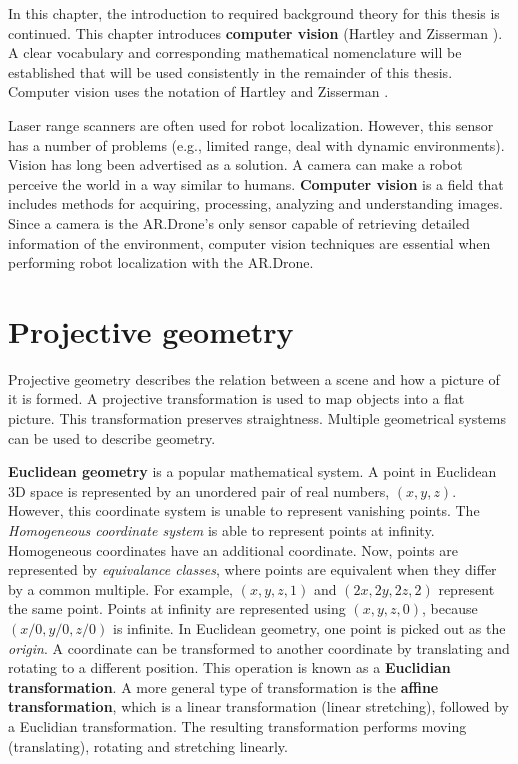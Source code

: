 In this chapter, the introduction to required background theory for this thesis is continued.
This chapter introduces \textbf{computer vision} (Hartley and Zisserman \cite{Hartley2004}).
A clear vocabulary and corresponding mathematical nomenclature will be established that will be used consistently in the remainder of this thesis.
Computer vision uses the notation of Hartley and Zisserman \cite{Hartley2004}.

Laser range scanners are often used for robot localization.
However, this sensor has a number of problems (e.g., limited range, deal with dynamic environments).
Vision has long been advertised as a solution.
A camera can make a robot perceive the world in a way similar to humans.
\textbf{Computer vision} is a field that includes methods for acquiring, processing, analyzing and understanding images.
Since a camera is the AR.Drone's only sensor capable of retrieving detailed information of the environment, computer vision techniques are essential when performing robot localization with the AR.Drone.

\section{Projective geometry}
\label{sec:background-projective-geometry}
Projective geometry describes the relation between a scene and how a picture of it is formed.
A projective transformation is used to map objects into a flat picture.
This transformation preserves straightness.
Multiple geometrical systems can be used to describe geometry.

\textbf{Euclidean geometry} is a popular mathematical system.
A point in Euclidean 3D space is represented by an unordered pair of real numbers, $(x, y, z)$.
However, this coordinate system is unable to represent vanishing points.
The \textit{Homogeneous coordinate system} is able to represent points at infinity.
Homogeneous coordinates have an additional coordinate.
Now, points are represented by \textit{equivalance classes}, where points are equivalent when they differ by a common multiple.
For example, $(x, y, z, 1)$ and $(2x, 2y, 2z, 2)$ represent the same point.
Points at infinity are represented using $(x, y, z, 0)$, because $(x/0, y/0, z/0)$ is infinite.
In Euclidean geometry, one point is picked out as the \textit{origin}.
A coordinate can be transformed to another coordinate by translating and rotating to a different position.
This operation is known as a \textbf{Euclidian transformation}.
A more general type of transformation is the \textbf{affine transformation}, which is a linear transformation (linear stretching), followed by a Euclidian transformation.
The resulting transformation performs moving (translating), rotating and
stretching linearly.

